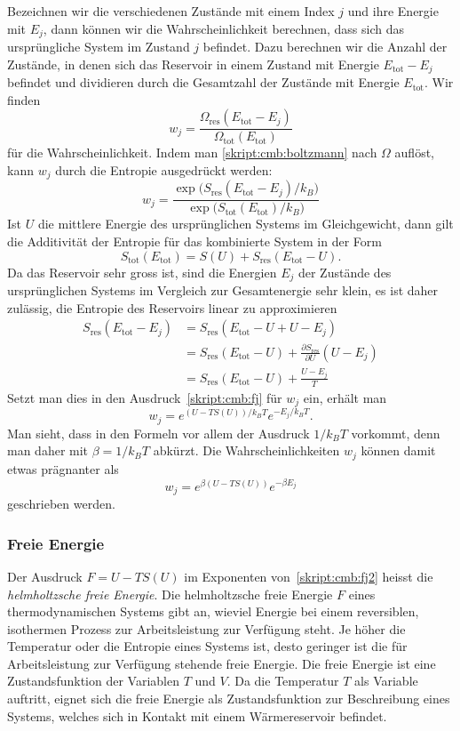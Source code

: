 Bezeichnen wir die verschiedenen Zustände mit einem Index $j$
und ihre Energie mit $E_j$, dann können wir die Wahrscheinlichkeit
berechnen, dass sich das ursprüngliche System im Zustand $j$ befindet.
Dazu berechnen wir die Anzahl der Zustände, in denen sich das 
Reservoir in einem Zustand mit Energie $E_\text{tot} - E_j$ befindet
und dividieren durch die Gesamtzahl der Zustände mit Energie $E_\text{tot}$.
Wir finden
\[
w_j
=
\frac{\Omega_\text{res}(E_\text{tot}-E_j)}{\Omega_\text{tot}(E_\text{tot})}
\]
für die Wahrscheinlichkeit.
Indem man \eqref{skript:cmb:boltzmann} nach $\Omega$ auflöst, kann $w_j$
durch die Entropie ausgedrückt werden:
\begin{equation}
w_j
=
\frac{\exp\bigl(S_\text{res}(E_\text{tot}-E_j)/k_B\bigr)}{\exp\bigl(S_\text{tot}(E_\text{tot})/k_B\bigr)}
\label{skript:cmb:fj}
\end{equation}
Ist $U$ die mittlere Energie des ursprünglichen Systems im Gleichgewicht,
dann gilt die Additivität der Entropie für das kombinierte System in der Form
\[
S_\text{tot}(E_\text{tot})
=
S(U) + S_\text{res}(E_\text{tot}-U).
\]
Da das Reservoir sehr gross ist, sind die Energien $E_j$ der Zustände des
ursprünglichen Systems im Vergleich zur Gesamtenergie sehr klein,
es ist daher zulässig, die Entropie des Reservoirs linear zu approximieren
\begin{align*}
S_\text{res}(E_\text{tot}-E_j)
&=
S_\text{res}(E_\text{tot}-U+U-E_j)
\\
&=
S_\text{res}(E_\text{tot}-U) + \frac{\partial S_\text{res}}{\partial U}(U-E_j)
\\
&=
S_\text{res}(E_\text{tot}-U) + \frac{U-E_j}{T}
\end{align*}
Setzt man dies in den Ausdruck~\eqref{skript:cmb:fj} für $w_j$ ein, 
erhält man
\[
w_j = e^{(U-TS(U))/k_BT} e^{-E_j/k_BT}.
\]
Man sieht, dass in den Formeln vor allem der Ausdruck $1/k_BT$ vorkommt,
denn man daher mit $\beta=1/k_BT$ abkürzt.
Die Wahrscheinlichkeiten $w_j$ können damit etwas prägnanter als
\begin{equation}
w_j = e^{\beta(U-TS(U))}e^{-\beta E_j}
\label{skript:cmb:fj2}
\end{equation}
geschrieben werden.

\subsubsection{Freie Energie}
Der Ausdruck $F=U-TS(U)$ im Exponenten von~\eqref{skript:cmb:fj2}
heisst die {\em helmholtzsche freie Energie}.
%
%
%
Die helmholtzsche freie Energie $F$ eines thermodynamischen Systems
gibt an, wieviel Energie bei einem reversiblen, isothermen Prozess zur
Arbeitsleistung zur Verfügung steht. 
Je höher die Temperatur oder die Entropie eines Systems ist, desto geringer
ist die für Arbeitsleistung zur Verfügung stehende freie Energie.
Die freie Energie ist eine Zustandsfunktion der Variablen $T$ und $V$.
Da die Temperatur $T$ als Variable auftritt, eignet sich die freie
Energie als Zustandsfunktion zur Beschreibung eines Systems, welches
sich in Kontakt mit einem Wärmereservoir befindet.

